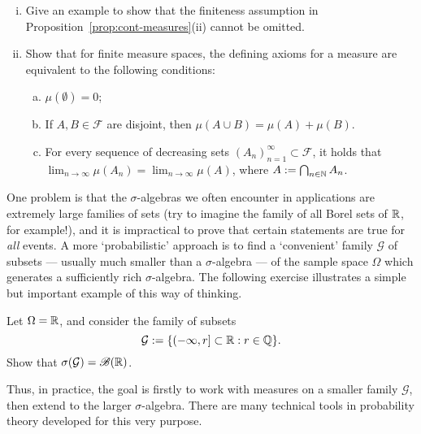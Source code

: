\begin{exercise}
\begin{enumerate}[(i)]
    \item Give an example to show that the finiteness assumption in Proposition~\ref{prop:cont-measures}(ii) cannot be omitted.

    \item Show that for finite measure spaces, the defining axioms for a measure are equivalent to the following conditions:
    \begin{enumerate}[(a)]
        \item $\mu(\emptyset)=0$;
        \item If $A,B\in\mathcal{F}$ are disjoint, then $\mu(A\cup B)=\mu(A)+\mu(B)$.
        \item For every sequence of decreasing sets $(A_n)_{n=1}^\infty\subset\mathcal{F}$, it holds that $\lim_{n\to\infty}\mu(A_n) = \lim_{n\to\infty}\mu(A)$, where $A:=\bigcap_{n\in\mathbb{N}}A_n$.
    \end{enumerate}
\end{enumerate}
\end{exercise}

One problem is that the $\sigma$-algebras we often encounter in applications are extremely large families of sets (try to imagine the family of all Borel sets of $\mathbb{R}$, for example!), and it is impractical to prove that certain statements are true for \emph{all} events. A more `probabilistic' approach is to find a `convenient' family $\mathcal{G}$ of subsets --- usually much smaller than a $\sigma$-algebra --- of the sample space $\Omega$ which generates a sufficiently rich $\sigma$-algebra. The following exercise illustrates a simple but important example of this way of thinking.
\begin{exercise}
\label{exer:Borel-gen}
    Let $\Omega=\mathbb{R}$, and consider the family of subsets
    \begin{equation*}
        \mathcal{G} := \{ (-\infty, r]\subset\mathbb{R} : r\in\mathbb{Q}\}.
    \end{equation*}
    Show that $\sigma(\mathcal{G}) = \mathscr{B}(\mathbb{R})$.
\end{exercise}

Thus, in practice, the goal is firstly to work with measures on a smaller family $\mathcal{G}$, then extend to the larger $\sigma$-algebra. There are many technical tools in probability theory developed for this very purpose.

